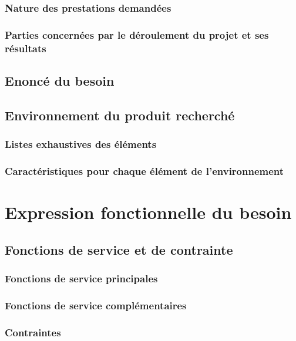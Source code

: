 \documentclass[10pt,a4paper]{article}
\begin{document}
\subsubsection{Nature des prestations demandées}
\subsubsection{Parties concernées par le déroulement du projet et ses résultats}

\subsection{Enoncé du besoin}

\subsection{Environnement du produit recherché}
\subsubsection{Listes exhaustives des éléments} 
\subsubsection{Caractéristiques pour chaque élément de l’environnement}

\section{Expression fonctionnelle du besoin}

\subsection{Fonctions de service et de contrainte}
\subsubsection{Fonctions de service principales}
\subsubsection{Fonctions de service complémentaires}
\subsubsection{Contraintes}
\end{document}
